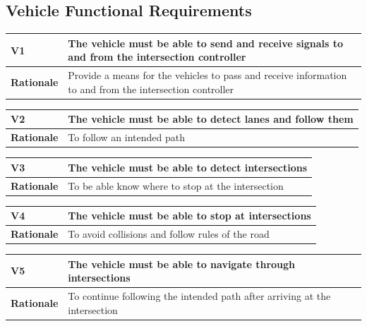 \documentclass [11pt]{article}
\begin{document}
\subsection{Vehicle Functional Requirements}


\begin{longtable}{| p{ } | p{ } | }\hline 
\rowcolor{tableCell}\textbf{V1} & The vehicle must be able to send and receive signals to and from the intersection controller \\ \hline
\textbf{Rationale} &  Provide a means for the vehicles to pass and receive information to and from the intersection controller\\ \hline 
\end{longtable}

\begin{longtable}{| p{ } | p{ } | }\hline 
\rowcolor{tableCell}\textbf{V2} & The vehicle must be able to detect lanes and follow them \\ \hline
\textbf{Rationale} &  To follow an intended path\\ \hline 

\end{longtable}

\begin{longtable}{| p{ } | p{ } | }\hline 
\rowcolor{tableCell}\textbf{V3} & The vehicle must be able to detect intersections \\ \hline
\textbf{Rationale} &  To be able know where to stop at the intersection\\ \hline 

\end{longtable}

\begin{longtable}{| p{ } | p{ } | }\hline 
\rowcolor{tableCell}\textbf{V4} & The vehicle must be able to stop at intersections \\ \hline
\textbf{Rationale} & To avoid collisions and follow rules of the road \\ \hline 

\end{longtable}

\begin{longtable}{| p{ } | p{ } | }\hline 
\rowcolor{tableCell}\textbf{V5} & The vehicle must be able to navigate through intersections \\ \hline
\textbf{Rationale} & To continue following the intended path after arriving at the intersection \\ \hline 

\end{longtable}
\end{document}
